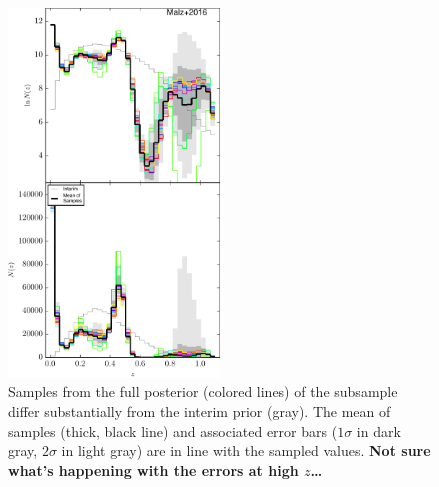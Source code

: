 \documentclass[preprint]{aastex}
\begin{document}
\begin{figure}
\includegraphics[width=0.5\textwidth]{figs/boss/samps.pdf}
\caption{Samples from the full posterior (colored lines) of the subsample 
differ substantially from the interim prior (gray).  The mean of samples 
(thick, black line) and associated error bars ($1\sigma$ in dark gray, 
$2\sigma$ in light gray) are in line with the sampled values.  \textbf{Not sure 
what's happening with the errors at high $z$\dots}}
\label{fig:dataparam}
\end{figure}
\end{document}

